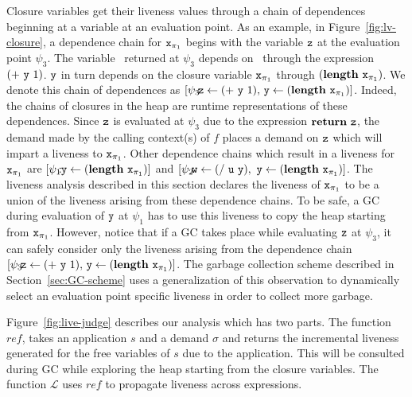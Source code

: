 \documentclass[9pt,nonatbib]{sigplanconf}
\begin{document}
 
Closure  variables  get  their  liveness values  through  a  chain  of
dependences beginning  at a  variable at an  evaluation point.   As an
example,  in  Figure~\ref{fig:lv-closure},   a  dependence  chain  for
$\mbox{\tt x}_{\mathit{\pi}_1}$  begins   with  the   variable  $\mbox{\tt z}$   at  the
evaluation  point $\psi_3$.   The variable  \pz\ returned  at $\psi_3$
depends on  \py\ through  the expression  $(+~\mbox{\tt y}~1)$.  $\mbox{\tt y}$  in turn
depends  on   the  closure  variable   $\mbox{\tt x}_{\mathit{\pi}_1}$  through
$(\mathbf{length}~\mbox{\tt x}_{\mathit{\pi}_1})$.  We
denote this  chain of  dependences as  $\lbrack \psi_3\!\!\!:\!\!\!\mbox{\tt z}
\leftarrow            (+~\mbox{\tt y}~1),\,           \mbox{\tt y}            \leftarrow
(\mathbf{length}~\mbox{\tt x}_{\mathit{\pi}_1})\rbrack$.    Indeed,   the   chains   of
closures  in   the  heap  are    runtime  representations   of  these
dependences.   Since  $\mbox{\tt z}$  is  evaluated  at  $\psi_3$  due  to  the
expression $\mbox{$\mathbf{ return}$}~\mbox{\tt z}$,  the demand made by  the calling context(s)
of  $f$ places  a demand  on  $\mbox{\tt z}$ which  will impart  a liveness  to
$\mbox{\tt x}_{\pi_1}$.  Other dependence chains which result in a liveness for
$\mbox{\tt x}_{\pi_1}$    are    $\lbrack    \psi_1\!\!\!:\!\!\mbox{\tt y}    \leftarrow
(\mathbf{length}~\mbox{\tt x}_{\pi_1})\rbrack$   and  $\lbrack   \psi_2\!\!\!:\!\!\!\mbox{\tt w}
\leftarrow          (/~\mbox{\tt u}~\mbox{\tt y}),\,\,           \mbox{\tt y}          \leftarrow
(\mathbf{length}~\mbox{\tt x}_{\pi_1})\rbrack$.   The  liveness analysis  described  in
this section declares  the liveness of $\mbox{\tt x}_{\pi_1}$ to be  a union of
the liveness arising  from these dependence chains.  To be  safe, a GC
during evaluation  of $\mbox{\tt y}$ at  $\psi_1$ has  to use this  liveness to
copy the heap starting from  $\mbox{\tt x}_{\pi_1}$.  However, notice that if a
GC  takes place  while evaluating  $\mbox{\tt z}$  at $\psi_3$,  it can  safely
consider only the liveness arising from the dependence chain\linebreak
$\lbrack \psi_3\!\!\!:\!\!\!\mbox{\tt z} \leftarrow (+~\mbox{\tt y}~1),\, \mbox{\tt y} \leftarrow
(\mathbf{length}~\mbox{\tt x}_{\pi_1})\rbrack$.    The    garbage   collection   scheme
described in Section~\ref{sec:GC-scheme} uses a generalization of this
observation  to  dynamically  select   an  evaluation  point  specific
liveness in order to collect more garbage.



Figure~\ref{fig:live-judge}  describes  our  analysis  which  has  two
parts. The  function $\mathit{ref}$,  takes an  application $s$  and a
demand $\sigma$ and returns the incremental liveness generated for the
free variables of $s$ due to  the application.  This will be consulted
during GC  while exploring the heap  starting from the
closure  variables.  The function $\mathcal{L}$  uses  $\mathit{ref}$ to  propagate
liveness across expressions.
\end{document}
